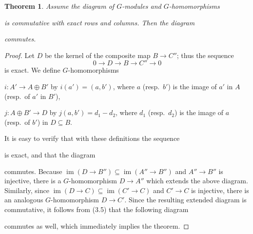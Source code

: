 \documentclass{article}
\newtheorem{theorem}{Theorem}[section]
\theoremstyle{definition}
\begin{document}
\begin{theorem}
Assume the diagram of $G$-modules and $G$-homomorphisms


is commutative with exact rows and columns. Then the diagram


commutes.
\end{theorem}

\begin{proof}
Let $D$ be the kernel of the composite map $B \to C''$; thus the sequence
$$
0 \longrightarrow D \longrightarrow B \longrightarrow C'' \longrightarrow 0
$$
is exact. We define $G$-homomorphisms

$i: A' \to A \oplus B'$ by $i(a') = (a, b')$, where $a$ (resp.\ $b'$) is the image of $a'$ in $A$ (resp.\ of $a'$ in $B'$),

$j: A \oplus B' \to D$ by $j(a, b') = d_1 - d_2$, where $d_1$ (resp.\ $d_2$) is the image of $a$ (resp.\ of $b'$) in $D \subseteq B$.

It is easy to verify that with these definitions the sequence


is exact, and that the diagram


commutes. Because $\operatorname{im}(D \to B'') \subseteq \operatorname{im}(A'' \to B'')$ and $A'' \to B''$ is injective, there is a $G$-homomorphism $D \to A''$ which extends the above diagram. Similarly, since $\operatorname{im}(D \to C) \subseteq \operatorname{im}(C' \to C)$ and $C' \to C$ is injective, there is an analogous $G$-homomorphism $D \to C'$. Since the resulting extended diagram is commutative, it follows from (3.5) that the following diagram


commutes as well, which immediately implies the theorem.
\end{proof}
\end{document}
